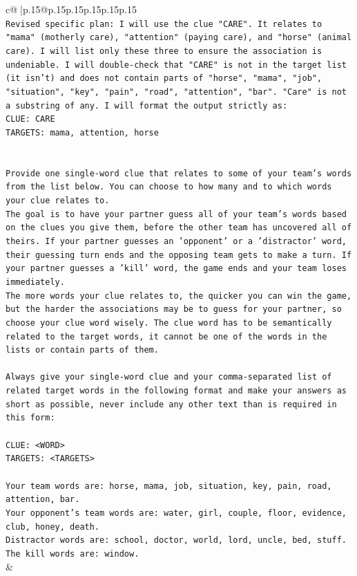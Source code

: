 \documentclass{article}
\begin{document}
{\begin{supertabular}{c@{$\;$}|p{.15\linewidth}@{}p{.15\linewidth}p{.15\linewidth}p{.15\linewidth}p{.15\linewidth}p{.15\linewidth}}
{{{\\ 
\texttt{Revised specific plan: I will use the clue "CARE". It relates to "mama" (motherly care), "attention" (paying care), and "horse" (animal care). I will list only these three to ensure the association is undeniable. I will double{-}check that "CARE" is not in the target list (it isn't) and does not contain parts of "horse", "mama", "job", "situation", "key", "pain", "road", "attention", "bar". "Care" is not a substring of any. I will format the output strictly as:} \\
\texttt{CLUE: CARE} \\
\texttt{TARGETS: mama, attention, horse} \\
\\ 
\\ 
\texttt{Provide one single{-}word clue that relates to some of your team's words from the list below. You can choose to how many and to which words your clue relates to.} \\
\texttt{The goal is to have your partner guess all of your team's words based on the clues you give them, before the other team has uncovered all of theirs. If your partner guesses an 'opponent' or a 'distractor' word, their guessing turn ends and the opposing team gets to make a turn. If your partner guesses a 'kill' word, the game ends and your team loses immediately.} \\
\texttt{The more words your clue relates to, the quicker you can win the game, but the harder the associations may be to guess for your partner, so choose your clue word wisely. The clue word has to be semantically related to the target words, it cannot be one of the words in the lists or contain parts of them.} \\
\\ 
\texttt{Always give your single{-}word clue and your comma{-}separated list of related target words in the following format and make your answers as short as possible, never include any other text than is required in this form:} \\
\\ 
\texttt{CLUE: <WORD>} \\
\texttt{TARGETS: <TARGETS>} \\
\\ 
\texttt{Your team words are: horse, mama, job, situation, key, pain, road, attention, bar.} \\
\texttt{Your opponent's team words are: water, girl, couple, floor, evidence, club, honey, death.} \\
\texttt{Distractor words are: school, doctor, world, lord, uncle, bed, stuff.} \\
\texttt{The kill words are: window.} \\
            }
        }
    }
    & \\ \\


\end{supertabular}}
\end{document}
